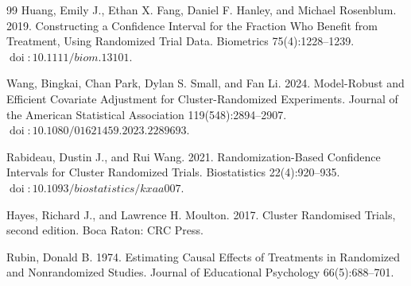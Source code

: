 \documentclass{article}
\begin{document}
\begin{thebibliography}{99}
   Huang, Emily J., Ethan X. Fang, Daniel F. Hanley, and Michael Rosenblum. 2019. Constructing a Confidence Interval for the Fraction Who Benefit from Treatment, Using Randomized Trial Data. Biometrics 75(4):1228--1239. \(\operatorname{doi}:10.1111/biom.13101\).

   Wang, Bingkai, Chan Park, Dylan S. Small, and Fan Li. 2024. Model-Robust and Efficient Covariate Adjustment for Cluster-Randomized Experiments. Journal of the American Statistical Association 119(548):2894--2907. \(\operatorname{doi}:10.1080/01621459.2023.2289693\).

   Rabideau, Dustin J., and Rui Wang. 2021. Randomization-Based Confidence Intervals for Cluster Randomized Trials. Biostatistics 22(4):920--935. \(\operatorname{doi}:10.1093/biostatistics/kxaa007\).

   Hayes, Richard J., and Lawrence H. Moulton. 2017. Cluster Randomised Trials, second edition. Boca Raton: CRC Press.

   Rubin, Donald B. 1974. Estimating Causal Effects of Treatments in Randomized and Nonrandomized Studies. Journal of Educational Psychology 66(5):688--701.

\end{thebibliography}
\end{document}
